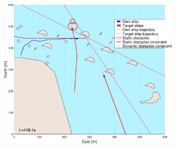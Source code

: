 \begin{figure}[ht]\ContinuedFloat
    \begin{subfigure}[b]{0.494\textwidth}
        \centering
        \includegraphics[width=\textwidth]{Images/NewFigures/skjergard_m_trafikk_NEW/_Simple_1fig1_time=150}
        \subcaption{}
    \end{subfigure}

\end{figure}
